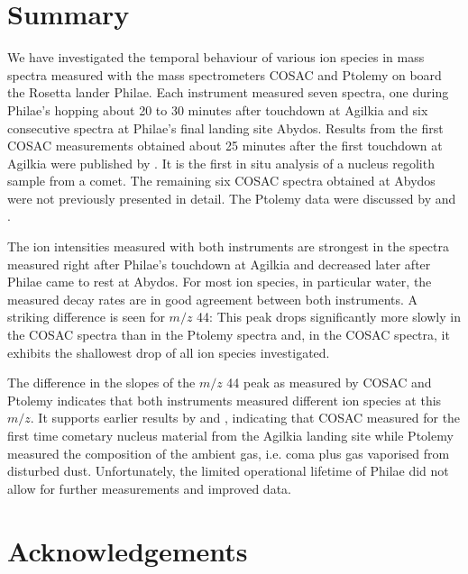 \documentclass{aa}
\begin{document}
%

\section{Summary}

\label{sec_conclusions}

We have investigated the temporal behaviour of various ion species in mass spectra measured with the mass 
spectrometers COSAC and Ptolemy on board the Rosetta lander Philae. Each instrument measured seven spectra, one during Philae's 
hopping about 20 to 30 minutes after touchdown at Agilkia and six consecutive spectra at Philae's 
final landing site Abydos. Results from the first COSAC measurements obtained about 25 minutes
after the first touchdown at Agilkia were published by \citet{goesmann2015}. It is the first 
in situ analysis of a nucleus  regolith sample from a comet. The remaining 
six COSAC spectra obtained at Abydos were not previously presented in detail.
The Ptolemy data were discussed by \citet{wright2015} and \citet{morse2015}. 

The ion intensities measured with both instruments are strongest in the spectra measured right
after Philae's touchdown at Agilkia and decreased later after Philae came to rest at Abydos. 
For most ion species, in particular water, the measured decay rates are in good agreement between 
both instruments. 
A striking difference is seen for $m/z$ 44: This peak drops significantly more slowly
in the COSAC spectra than in the Ptolemy spectra and, in the COSAC spectra, it exhibits 
the shallowest drop of all ion species investigated. 

The difference in the slopes of the $m/z$ 44 peak as measured by COSAC and Ptolemy indicates that both instruments
measured different ion species at this $m/z$. It  supports earlier results by \citet{goesmann2015} 
and \citet{wright2015},
indicating that COSAC measured for the first time cometary nucleus material from the Agilkia landing site
while Ptolemy measured the 
composition of the ambient gas, i.e. coma plus gas vaporised from disturbed dust. 
Unfortunately, the  limited operational lifetime of Philae
did not allow for further measurements and improved data.  


\section*{Acknowledgements}
\end{document}
